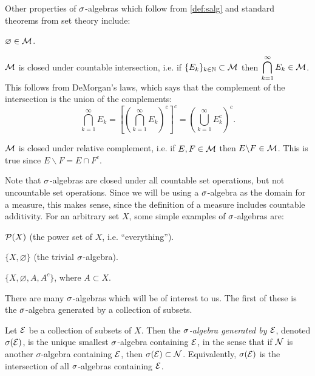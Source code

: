 \documentclass[main.tex]{subfiles}
\begin{document}
Other properties of ${\sigma}$-algebras which follow from \cref{def:salg} and standard theorems from set theory include:
\begin{romannum}\setcounter{rmnum}{3}
	\item $\varnothing \in {\mathcal M}$.
	\item ${\mathcal M}$ is closed under countable intersection, i.e. if $\{E_k\}_{k \in {\mathbb N}} \subset {\mathcal M}$ then $\begin{aligned}\bigcap_{k=1}^\infty E_k \in {\mathcal M} \end{aligned}$. This follows from DeMorgan's laws, which says that the complement of the intersection is the union of the complements:
	\[
	\bigcap_{k=1}^\infty E_k = \left[ \left( \bigcap_{k=1}^\infty E_k \right)^c \right]^c
	= \left( \bigcup_{k=1}^\infty E_k^c \right)^c.
	\]
	\item ${\mathcal M}$ is closed under relative complement, i.e. if $E, F \in {\mathcal M}$ then $E \backslash F \in {\mathcal M}$. This is true since $E \backslash F = E \cap F^c$.
\end{romannum}

Note that ${\sigma}$-algebras are closed under all countable set operations, but not uncountable set operations. Since we will be using a ${\sigma}$-algebra as the domain for a measure, this makes sense, since the definition of a measure includes countable additivity. For an arbitrary set $X$, some simple examples of ${\sigma}$-algebras are:
\begin{remunerate}
\item ${\mathcal P}(X)$ (the power set of $X$, i.e. ``everything'').
\item $\{ X, \varnothing \}$ (the trivial ${\sigma}$-algebra).
\item $\{ X, \varnothing, A, A^c \}$, where $A \subset X$.
\end{remunerate}

There are many ${\sigma}$-algebras which will be of interest to us. The first of these is the ${\sigma}$-algebra generated by a collection of subsets.

\begin{definition}Let ${\mathcal E}$ be a collection of subsets of $X$. Then the \emph{${\sigma}$-algebra generated by ${\mathcal E}$}, denoted ${\sigma}({\mathcal E})$, is the unique smallest ${\sigma}$-algebra containing ${\mathcal E}$, in the sense that if ${\mathcal N}$ is another $\sigma$-algebra containing ${\mathcal E}$, then ${\sigma}({\mathcal E}) \subset {\mathcal N}$. Equivalently, ${\sigma}({\mathcal E})$ is the intersection of all ${\sigma}$-algebras containing ${\mathcal E}$.
\end{definition}
\end{document}
